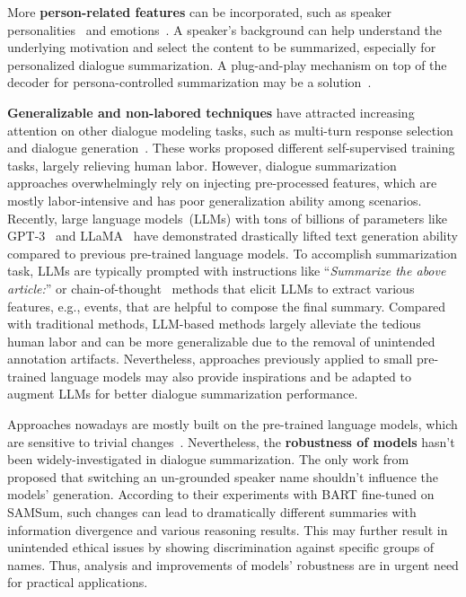 More \textbf{person-related features} can be incorporated, 
such as speaker personalities~\cite{zhang2019consistent} and 
emotions~\cite{majumder2019dialoguernn}. A speaker's background can help understand the underlying motivation and select the content to be summarized, especially for personalized dialogue summarization.
A plug-and-play mechanism on top of the decoder for persona-controlled summarization may be a solution~\cite{DathathriMLHFMY20}.
 



\textbf{Generalizable and non-labored techniques} have attracted increasing attention on other dialogue modeling tasks, 
such as multi-turn response selection~\cite{xu2021learning} and 
dialogue generation~\cite{zhang2019consistent}. 
These works proposed different self-supervised training tasks, largely relieving human labor.
However, dialogue summarization approaches overwhelmingly 
rely on injecting pre-processed features, which are mostly labor-intensive and has poor generalization ability among scenarios.
Recently, large language models~(LLMs) with tons of billions of parameters like GPT-3~\cite{brown2020language} and LLaMA~\cite{touvron2023llama} have demonstrated drastically lifted text generation ability compared to previous pre-trained language models. To accomplish summarization task, LLMs are typically prompted with instructions like ``\textit{Summarize the above article:}'' or chain-of-thought~\cite{cot,wang-etal-2023-element} methods that elicit LLMs to extract various features, e.g., events, that are helpful to compose the final summary. Compared with traditional methods, LLM-based methods largely alleviate the tedious human labor and can be more generalizable due to the removal of unintended annotation artifacts. Nevertheless, approaches previously applied to small pre-trained language models may also provide inspirations and be adapted to augment LLMs for better dialogue summarization performance.

Approaches nowadays are mostly built on the pre-trained language models, which are sensitive to trivial changes~\cite{wang-etal-2022-rely,yan2022robustness}. 
Nevertheless, the \textbf{robustness of models} hasn't been widely-investigated in dialogue summarization. The only work from~\citet{jia2023reducing} proposed that switching an un-grounded speaker name shouldn't influence the models' generation. According to their experiments with BART fine-tuned on SAMSum, such changes can lead to dramatically different summaries with information divergence and various reasoning results. This may further result in unintended ethical issues by showing discrimination against specific groups of names. Thus, analysis and improvements of models' robustness are in urgent need for practical applications.



